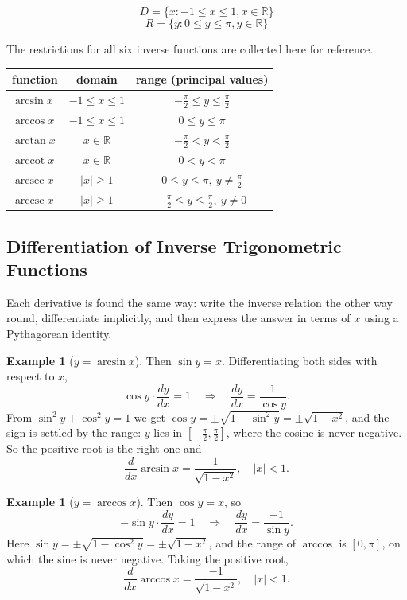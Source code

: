 \documentclass[11pt,a4paper]{article}
\theoremstyle{definition}
\newtheorem{example}[thm]{Example}
\begin{document}
$$D=\{x:-1\leq x\leq 1, x\in \mathbb{R}\}$$
$$R=\{y:0\leq y \leq \pi, y\in \mathbb{R}\}$$

The restrictions for all six inverse functions are collected here for reference.

\begin{table}[H]
\centering
\begin{tabular}{l|c|c}
function & domain & range (principal values)\\
\hline
$\arcsin x$ & $-1\leq x\leq 1$ & $-\frac{\pi}{2}\leq y\leq\frac{\pi}{2}$\\
$\arccos x$ & $-1\leq x\leq 1$ & $0\leq y\leq\pi$\\
$\arctan x$ & $x\in\mathbb{R}$ & $-\frac{\pi}{2}<y<\frac{\pi}{2}$\\
$\operatorname{arccot} x$ & $x\in\mathbb{R}$ & $0<y<\pi$\\
$\operatorname{arcsec} x$ & $\left|x\right|\geq 1$ & $0\leq y\leq\pi,\ y\neq\frac{\pi}{2}$\\
$\operatorname{arccsc} x$ & $\left|x\right|\geq 1$ & $-\frac{\pi}{2}\leq y\leq\frac{\pi}{2},\ y\neq 0$\\
\end{tabular}
\end{table}

\subsection{Differentiation of Inverse Trigonometric Functions}
Each derivative is found the same way: write the inverse relation the other way
round, differentiate implicitly, and then express the answer in terms of $x$ using
a Pythagorean identity.

\begin{example}[$y=\arcsin x$]
Then $\sin y=x$. Differentiating both sides with respect to $x$,
$$\cos y\cdot\frac{dy}{dx}=1
\quad \Longrightarrow\quad 
\frac{dy}{dx}=\frac{1}{\cos y}.$$
From $\sin^{2}y+\cos^{2}y=1$ we get $\cos y=\pm\sqrt{1-\sin^{2}y}=\pm\sqrt{1-x^{2}}$,
and the sign is settled by the range: $y$ lies in
$\left[-\frac{\pi}{2},\frac{\pi}{2}\right]$, where the cosine is never negative.
So the positive root is the right one and
$$\frac{d}{dx}\arcsin x=\frac{1}{\sqrt{1-x^{2}}},\quad \left|x\right|<1 .$$
\end{example}

\begin{example}[$y=\arccos x$]
Then $\cos y=x$, so
$$-\sin y\cdot\frac{dy}{dx}=1
\quad \Longrightarrow\quad 
\frac{dy}{dx}=\frac{-1}{\sin y}.$$
Here $\sin y=\pm\sqrt{1-\cos^{2}y}=\pm\sqrt{1-x^{2}}$, and the range of $\arccos$
is $[0,\pi]$, on which the sine is never negative. Taking the positive root,
$$\frac{d}{dx}\arccos x=\frac{-1}{\sqrt{1-x^{2}}},\quad \left|x\right|<1 .$$
\end{example}
\end{document}
